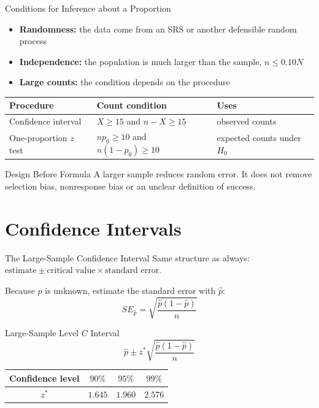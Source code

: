 \documentclass[aspectratio=169,10pt]{beamer}
\begin{document}
\begin{frame}{Conditions for Inference about a Proportion}
\begin{itemize}
  \setlength{\itemsep}{0.15cm}
  \item \textbf{Randomness:} the data come from an SRS or another defensible random process
  \item \textbf{Independence:} the population is much larger than the sample, $n\le0.10N$
  \item \textbf{Large counts:} the condition depends on the procedure
\end{itemize}

\begin{center}
\begin{tabular}{lll}
\toprule
\textbf{Procedure} & \textbf{Count condition} & \textbf{Uses} \\
\midrule
Confidence interval & $X\ge15$ and $n-X\ge15$ & observed counts \\
One-proportion $z$ test & $np_0\ge10$ and $n(1-p_0)\ge10$ & expected counts under $H_0$ \\
\bottomrule
\end{tabular}
\end{center}

\begin{block}{Design Before Formula}
A larger sample reduces random error. It does not remove selection bias, nonresponse bias or an unclear definition of success.
\end{block}
\end{frame}

\section{Confidence Intervals}

\begin{frame}{The Large-Sample Confidence Interval}
Same structure as always: $\text{estimate}\pm\text{critical value}\times\text{standard error}$.

\vspace{0.2cm}
Because $p$ is unknown, estimate the standard error with $\hat{p}$:
\[
SE_{\hat{p}}=\sqrt{\frac{\hat{p}(1-\hat{p})}{n}}
\]

\begin{block}{Large-Sample Level $C$ Interval}
\[
\hat{p}\pm z^*\sqrt{\frac{\hat{p}(1-\hat{p})}{n}}
\]
\end{block}

\begin{center}
\begin{tabular}{cccc}
\toprule
Confidence level & $90\%$ & $95\%$ & $99\%$ \\
\midrule
$z^*$ & $1.645$ & $1.960$ & $2.576$ \\
\bottomrule
\end{tabular}
\end{center}
\end{frame}
\end{document}
